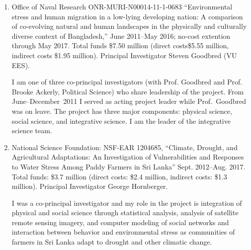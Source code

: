 \begin{enumerate}
	\item Office of Naval Research ONR-MURI-N00014-11-1-0683 ``Environmental stress and human migration in a low-lying developing nation: A comparison of co-evolving natural and human landscapes in the physically and culturally diverse context of Bangladesh,'' June 2011--May 2016; no-cost extention through May 2017. Total funds \$7.50 million (direct costs\$5.55 million, indirect costs \$1.95 million). Principal Investigator Steven Goodbred (VU EES). 
	\begin{credit}
	I am one of three co-principal investigators (with Prof. Goodbred and Prof. Brooke Ackerly, Political Science) who share leadership of the project. From June--December~2011 I served as acting project leader while Prof.~Goodbred was on leave. The project has three major components: physical science, social science, and integrative science. I am the leader of the integrative science team.
	\end{credit}
	\item National Science Foundation: NSF-EAR 1204685, ``Climate, Drought, and Agricultural Adaptations: An Investigation of Vulnerabilities and Responses to Water Stress Among Paddy Farmers in Sri Lanka'' Sept. 2012--Aug. 2017. Total funds: \$3.7 million (direct costs: \$2.4 million, indirect costs: \$1.3 million). Principal Investigator George Hornberger. 
	\begin{credit}
	I was a co-principal investigator and my role in the project is integration of physical and social science through statistical analysis, analysis of satellite remote sensing imagery, and computer modeling of social networks and interaction between behavior and environmental stress as communities of farmers in Sri Lanka adapt to drought and other climatic change.
	\end{credit}
\end{enumerate}
\iffalse
